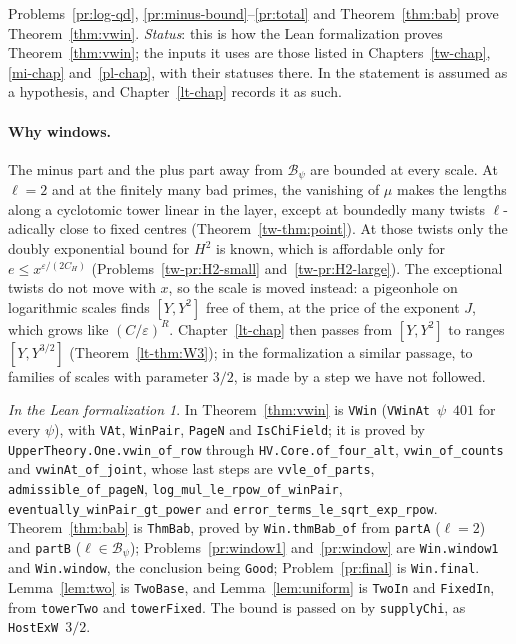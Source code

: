 \documentclass[reqno]{amsart}
\newcounter{chap}
\theoremstyle{definition}
\theoremstyle{plain}
\theoremstyle{remark}
\newtheorem*{leanremark}{In the Lean formalization}
\newcommand{\Bc}{\mathcal{B}}
\newcommand{\tl}[1]{\texttt{#1}}
\begin{document}
Problems~\ref{pr:log-qd}, \ref{pr:minus-bound}--\ref{pr:total} and Theorem~\ref{thm:bab} prove Theorem~\ref{thm:vwin}.  \emph{Status}: this is how the Lean formalization proves Theorem~\ref{thm:vwin}; the inputs it uses are those listed in Chapters~\ref{tw-chap}, \ref{mi-chap} and~\ref{pl-chap}, with their statuses there.  In \cite{Adr} the statement is assumed as a hypothesis, and Chapter~\ref{lt-chap} records it as such.

\paragraph{Why windows.}
The minus part and the plus part away from \(\Bc_\psi\) are bounded at every scale.  At \(\ell=2\) and at the finitely many bad primes, the vanishing of \(\mu\) makes the lengths along a cyclotomic tower linear in the layer, except at boundedly many twists \(\ell\)-adically close to fixed centres (Theorem~\ref{tw-thm:point}).  At those twists only the doubly exponential bound for \(H^2\) is known, which is affordable only for \(e\le x^{\varepsilon/(2C_H)}\) (Problems~\ref{tw-pr:H2-small} and~\ref{tw-pr:H2-large}).  The exceptional twists do not move with \(x\), so the scale is moved instead: a pigeonhole on logarithmic scales finds \([Y,Y^2]\) free of them, at the price of the exponent \(J\), which grows like \((C/\varepsilon)^R\).  Chapter~\ref{lt-chap} then passes from \([Y,Y^2]\) to ranges \([Y,Y^{3/2}]\) (Theorem~\ref{lt-thm:W3}); in the formalization a similar passage, to families of scales with parameter \(3/2\), is made by a step we have not followed.

\begin{leanremark}
\raggedright In \cite{Lean} Theorem~\ref{thm:vwin} is \tl{VWin} (\tl{VWinAt}~\(\psi\)~\(401\) for every \(\psi\)), with \tl{VAt}, \tl{WinPair}, \tl{PageN} and \tl{IsChiField}; it is proved by \tl{UpperTheory.\allowbreak{}One.\allowbreak{}vwin\_\allowbreak{}of\_\allowbreak{}row} through \tl{HV.\allowbreak{}Core.\allowbreak{}of\_\allowbreak{}four\_\allowbreak{}alt}, \tl{vwin\_\allowbreak{}of\_\allowbreak{}counts} and \tl{vwinAt\_\allowbreak{}of\_\allowbreak{}joint}, whose last steps are \tl{vvle\_\allowbreak{}of\_\allowbreak{}parts}, \tl{admissible\_\allowbreak{}of\_\allowbreak{}pageN}, \tl{log\_\allowbreak{}mul\_\allowbreak{}le\_\allowbreak{}rpow\_\allowbreak{}of\_\allowbreak{}winPair}, \tl{eventually\_\allowbreak{}winPair\_\allowbreak{}gt\_\allowbreak{}power} and \tl{error\_\allowbreak{}terms\_\allowbreak{}le\_\allowbreak{}sqrt\_\allowbreak{}exp\_\allowbreak{}rpow}.  Theorem~\ref{thm:bab} is \tl{ThmBab}, proved by \tl{Win.\allowbreak{}thmBab\_\allowbreak{}of} from \tl{partA} (\(\ell=2\)) and \tl{partB} (\(\ell\in\Bc_\psi\)); Problems~\ref{pr:window1} and~\ref{pr:window} are \tl{Win.\allowbreak{}window1} and \tl{Win.\allowbreak{}window}, the conclusion being \tl{Good}; Problem~\ref{pr:final} is \tl{Win.\allowbreak{}final}.  Lemma~\ref{lem:two} is \tl{TwoBase}, and Lemma~\ref{lem:uniform} is \tl{TwoIn} and \tl{FixedIn}, from \tl{towerTwo} and \tl{towerFixed}.  The bound is passed on by \tl{supplyChi}, as \tl{HostExW}~\(3/2\).
\end{leanremark}
\end{document}
